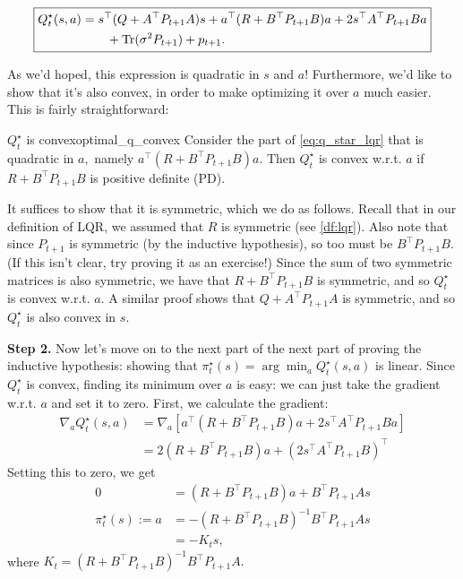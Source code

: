\documentclass[../main/main]{subfiles}
\begin{document}
\begin{equation}
    \boxed{
        \begin{aligned}
            Q^\star_t(s, a) &= s^\top (Q + A^\top P_{t+1} A) s + a^\top (R + B^\top P_{t+1} B) a
            + 2s^\top A^\top P_{t+1} B a \\
            &\qquad + \operatorname*{\textrm{Tr}}(\sigma^2 P_{t+1}) + p_{t+1}.
        \end{aligned}
    }
    \label{eq:q_star_lqr}
\end{equation}

As we'd hoped, this expression is quadratic in $s$ and $a$!
Furthermore, we'd like to show that it's also convex, in order to make optimizing it over $a$ much easier.
This is fairly straightforward:

\begin{theorem}{$Q^\star_t$ is convex}{optimal_q_convex}
    Consider the part of \autoref{eq:q_star_lqr} that is quadratic in $a,$ namely
    $a^\top (R + B^\top P_{t+1} B) a.$ Then $Q^\star_t$ is convex w.r.t. $a$
    if $R + B^\top P_{t+1} B$ is positive definite (PD).
    
    It suffices to show that it is symmetric, which we do as follows. Recall that in our definition of LQR,
    we assumed that $R$ is symmetric (see \autoref{df:lqr}).
    Also note that since $P_{t+1}$ is symmetric (by the inductive hypothesis), so too must be $B^\top P_{t+1} B.$ (If this isn't clear, try proving it as an exercise!)
    Since the sum of two symmetric matrices is also symmetric, we have that $R + B^\top P_{t+1} B$ is symmetric,
    and so $Q^\star_t$ is convex w.r.t. $a.$ A similar proof shows that $Q + A^\top P_{t+1} A$ is symmetric, and so $Q^\star_t$ is also convex in $s.$
\end{theorem}

\textbf{Step 2.} Now let's move on to the next part of the next part of proving the inductive hypothesis:
showing that $\pi^\star_t(s) = \arg \min_a Q^\star_t(s, a)$ is linear.
Since $Q^\star_t$ is convex, finding its minimum over $a$ is easy:
we can just take the gradient w.r.t. $a$ and set it to zero.
First, we calculate the gradient:
\begin{align*}
    \nabla_a Q^\star_t(s, a) &= \nabla_a [ a^\top (R + B^\top P_{t+1} B) a + 2 s^\top A^\top P_{t+1} B a ] \\
    &= 2 (R + B^\top P_{t+1} B) a + (2 s^\top A^\top P_{t+1} B)^\top
\end{align*}
Setting this to zero, we get \begin{align}
    0 &= (R + B^\top P_{t+1} B) a + B^\top P_{t+1} A s \nonumber \\
    \pi^\star_t(s) := a &= -(R + B^\top P_{t+1} B)^{-1} B^\top P_{t+1} A s \nonumber \\
    &= - K_t s,
\end{align}
where $K_t = (R + B^\top P_{t+1} B)^{-1} B^\top P_{t+1} A.$
\end{document}
